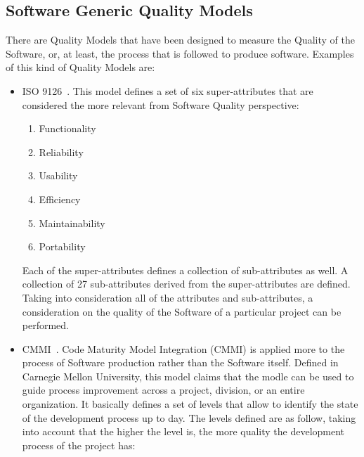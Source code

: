 \documentclass[11pt]{article}
\begin{document}
\subsection{Software Generic Quality Models}
There are Quality Models that have been designed to measure the Quality of the Software, or, at least, the process that is followed to produce software. Examples of this kind of Quality Models are:
\begin{itemize}\itemsep0pt
\item{ISO 9126}~\cite{ISO00, ISO01}.
This model defines a set of six super-attributes that are considered the more relevant from Software Quality perspective:
\begin{enumerate}
\item{Functionality}
\item{Reliability}
\item{Usability}
\item{Efficiency}
\item{Maintainability}
\item{Portability}
\end{enumerate}
Each of the super-attributes defines a collection of sub-attributes as well. A collection of 27 sub-attributes derived from the super-attributes are defined.
Taking into consideration all of the attributes and sub-attributes, a consideration on the quality of the Software of a particular project can be performed.
\item{CMMI}~\cite{CMMI00}.
Code Maturity Model Integration (CMMI) is applied more to the process of Software production rather than the Software itself. Defined in Carnegie Mellon University, this model claims that the modle can be used to guide process improvement across a project, division, or an entire organization.
It basically defines a set of levels that allow to identify the state of the development process up to day. The levels defined are as follow, taking into account that the higher the level is, the more quality the development process of the project has:
\end{itemize}
\end{document}

